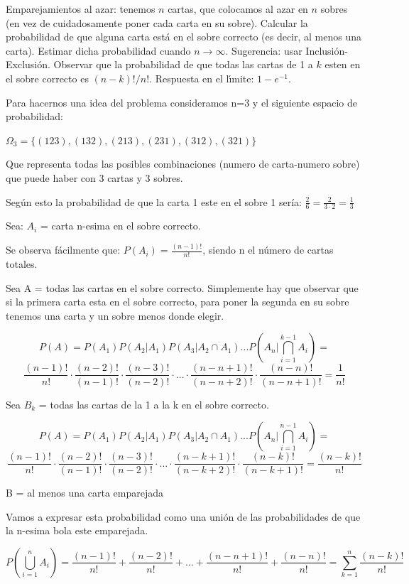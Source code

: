 \begin{problem}[11] Emparejamientos al azar: tenemos $n$ cartas, que colocamos al azar en $n$ sobres
(en vez de cuidadosamente poner cada carta en su sobre).
Calcular la probabilidad de que alguna carta est\'a en el sobre correcto
(es decir, al menos una carta). Estimar dicha probabilidad cuando
$n\to\infty$. Sugerencia: usar Inclusi\'on-Exclusi\'on.
Observar que la probabilidad de que todas las cartas de 1 a $k$ esten en el sobre correcto
es $(n-k)!/n!$. Respuesta en el l\'{\i}mite: $1 - e^{-1}$.
\solution

\begin{expla}

Para hacernos una idea del problema consideramos n=3 y el siguiente espacio de probabilidad:

$\Omega_3=\{(123),(132),(213),(231),(312),(321)\}$

Que representa todas las posibles combinaciones (numero de carta-numero sobre) que puede haber con 3 cartas y 3 sobres. 

Según esto la probabilidad de que la carta 1 este en el sobre 1 sería: $\frac{2}{6} = \frac{2}{3\cdot 2}=\frac{1}{3}$

Sea: $A_i$ = carta n-esima en el sobre correcto.

Se observa fácilmente que: $P(A_i) = \frac{(n-1)!}{n!}$, siendo n el número de cartas totales.

Sea A = todas las cartas en el sobre correcto. Simplemente hay que observar que si la primera carta esta en el sobre correcto, para poner la segunda en su sobre tenemos una carta y un sobre menos donde elegir.

\[
P(A)=P(A_1)P(A_2|A_1)P(A_3|A_2\cap A_1)...P(A_n|\bigcap_{i=1}^{k-1}A_i)=
\]
\[
\frac{(n-1)!}{n!}\cdot\frac{(n-2)!}{(n-1)!}\cdot\frac{(n-3)!}{(n-2)!}\cdot...\cdot\frac{(n-n+1)!}{(n-n+2)!}\cdot\frac{(n-n)!}{(n-n+1)!}=\frac{1}{n!}
\]

Sea $B_k$ = todas las cartas de la 1 a la k en el sobre correcto.

\[
P(A)=P(A_1)P(A_2|A_1)P(A_3|A_2\cap A_1)...P(A_n|\bigcap_{i=1}^{n-1}A_i)=
\]
\[
\frac{(n-1)!}{n!}\cdot\frac{(n-2)!}{(n-1)!}\cdot\frac{(n-3)!}{(n-2)!}\cdot...\cdot\frac{(n-k+1)!}{(n-k+2)!}\cdot\frac{(n-k)!}{(n-k+1)!}=\frac{(n-k)!}{n!}
\]
\end{expla}

B = al menos una carta emparejada

Vamos a expresar esta probabilidad como una unión de las probabilidades de que la n-esima bola este emparejada.


\[
P(\bigcup_{i=1}^nA_i)=\frac{(n-1)!}{n!}+\frac{(n-2)!}{n!}+...+\frac{(n-n+1)!}{n!}+\frac{(n-n)!}{n!}=\sum_{k=1}^{n}\frac{(n-k)!}{n!}
\]
\end{problem}

